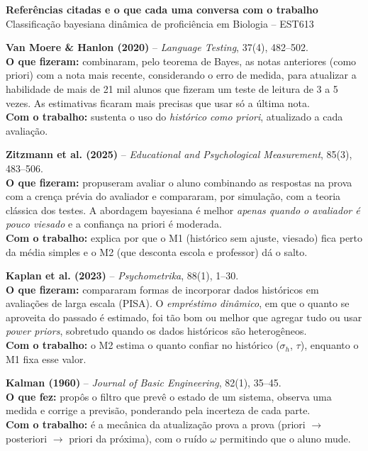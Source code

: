 \documentclass[10pt,a4paper]{article}
\begin{document}
{\large\bfseries Referências citadas e o que cada uma conversa com o trabalho}\\[0.2em]
{\small Classificação bayesiana dinâmica de proficiência em Biologia -- EST613}

\vspace{0.6em}

\textbf{Van Moere \& Hanlon (2020)} -- \textit{Language Testing}, 37(4), 482--502.\\
\textbf{O que fizeram:} combinaram, pelo teorema de Bayes, as notas anteriores (como priori) com a nota mais recente, considerando o erro de medida, para atualizar a habilidade de mais de 21 mil alunos que fizeram um teste de leitura de 3 a 5 vezes. As estimativas ficaram mais precisas que usar só a última nota.\\
\textbf{Com o trabalho:} sustenta o uso do \emph{histórico como priori}, atualizado a cada avaliação.

\textbf{Zitzmann et al. (2025)} -- \textit{Educational and Psychological Measurement}, 85(3), 483--506.\\
\textbf{O que fizeram:} propuseram avaliar o aluno combinando as respostas na prova com a crença prévia do avaliador e compararam, por simulação, com a teoria clássica dos testes. A abordagem bayesiana é melhor \emph{apenas quando o avaliador é pouco viesado} e a confiança na priori é moderada.\\
\textbf{Com o trabalho:} explica por que o M1 (histórico sem ajuste, viesado) fica perto da média simples e o M2 (que desconta escola e professor) dá o salto.

\textbf{Kaplan et al. (2023)} -- \textit{Psychometrika}, 88(1), 1--30.\\
\textbf{O que fizeram:} compararam formas de incorporar dados históricos em avaliações de larga escala (PISA). O \emph{empréstimo dinâmico}, em que o quanto se aproveita do passado é estimado, foi tão bom ou melhor que agregar tudo ou usar \emph{power priors}, sobretudo quando os dados históricos são heterogêneos.\\
\textbf{Com o trabalho:} o M2 estima o quanto confiar no histórico ($\sigma_h$, $\tau$), enquanto o M1 fixa esse valor.

\textbf{Kalman (1960)} -- \textit{Journal of Basic Engineering}, 82(1), 35--45.\\
\textbf{O que fez:} propôs o filtro que prevê o estado de um sistema, observa uma medida e corrige a previsão, ponderando pela incerteza de cada parte.\\
\textbf{Com o trabalho:} é a mecânica da atualização prova a prova (priori $\to$ posteriori $\to$ priori da próxima), com o ruído $\omega$ permitindo que o aluno mude.
\end{document}

